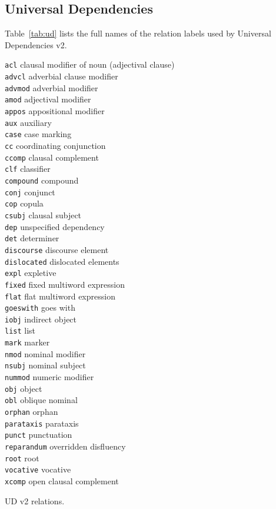 \subsection{Universal Dependencies}

Table~\ref{tab:ud} lists the full names of the
relation labels used by Universal Dependencies v2.

\begin{table}[H]
\footnotesize
\begin{multicols}{2}
\texttt{acl} clausal modifier of noun (adjectival clause) \\
\texttt{advcl} adverbial clause modifier \\
\texttt{advmod} adverbial modifier \\
\texttt{amod} adjectival modifier \\
\texttt{appos} appositional modifier \\
\texttt{aux} auxiliary \\
\texttt{case} case marking \\
\texttt{cc} coordinating conjunction \\
\texttt{ccomp} clausal complement \\
\texttt{clf} classifier \\
\texttt{compound} compound \\
\texttt{conj} conjunct \\
\texttt{cop} copula \\
\texttt{csubj} clausal subject \\
\texttt{dep} unspecified dependency \\
\texttt{det} determiner \\
\texttt{discourse} discourse element \\
\texttt{dislocated} dislocated elements \\
\texttt{expl} expletive \\
\texttt{fixed} fixed multiword expression \\
\texttt{flat} flat multiword expression \\
\texttt{goeswith} goes with \\
\texttt{iobj} indirect object \\
\texttt{list} list \\
\texttt{mark} marker \\
\texttt{nmod} nominal modifier \\
\texttt{nsubj} nominal subject \\
\texttt{nummod} numeric modifier \\
\texttt{obj} object \\
\texttt{obl} oblique nominal \\
\texttt{orphan} orphan \\
\texttt{parataxis} parataxis \\
\texttt{punct} punctuation \\
\texttt{reparandum} overridden disfluency \\
\texttt{root} root \\
\texttt{vocative} vocative \\
\texttt{xcomp} open clausal complement
\end{multicols}
\caption{UD v2 relations.\label{tab:ud}}
\end{table}

